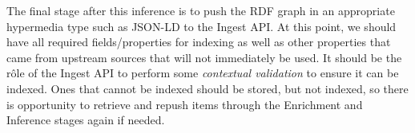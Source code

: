 The final stage after this inference is to push the RDF graph in
an appropriate hypermedia type such as JSON-LD to the Ingest API. At this
point, we should have all required fields/properties for indexing as
well as other properties that came from upstream sources that will not
immediately be used. It should be the r\^ole of the Ingest API to perform
some \emph{contextual validation}\cite{fowler2005contextual} to ensure
it can be indexed. Ones that cannot be indexed should be stored, but
not indexed, so there is opportunity to retrieve and repush items through
the Enrichment and Inference stages again if needed.
